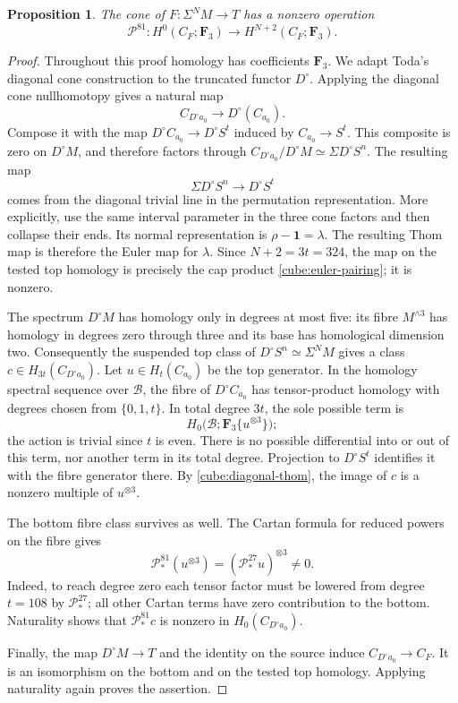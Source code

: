 \documentclass[11pt]{article}
\newtheorem{proposition}[theorem]{Proposition}
\theoremstyle{definition}
\theoremstyle{remark}
\numberwithin{equation}{section}
\begin{document}
\begin{proposition}\label{cube:primary-detection}
The cone of \(F:\Sigma^NM\to T\) has a nonzero operation
\[
 \mathcal P^{81}:H^0(C_F;\mathbf F_3)\longrightarrow
 H^{N+2}(C_F;\mathbf F_3).
\]
\end{proposition}

\begin{proof}
Throughout this proof homology has coefficients \(\mathbf F_3\).
We adapt Toda's diagonal cone construction
\cite[Section~1, Theorem~2]{TodaExtended} to the truncated functor
\(D^\circ\). Applying the diagonal cone nullhomotopy gives a natural map
\[
 C_{D^\circ a_0}\longrightarrow D^\circ(C_{a_0}).
\]
Compose it with the map \(D^\circ C_{a_0}\to D^\circ S^t\)
induced by \(C_{a_0}\to S^t\).  This composite is zero on
\(D^\circ M\), and therefore factors through
\(C_{D^\circ a_0}/D^\circ M\simeq\Sigma D^\circ S^n\).
The resulting map
\begin{equation}\label{cube:diagonal-thom}
 \Sigma D^\circ S^n\longrightarrow D^\circ S^t
\end{equation}
comes from the diagonal trivial line in the permutation
representation.  More explicitly, use the same interval
parameter in the three cone factors and then collapse
their ends.  Its normal representation is
\(\rho-\mathbf1=\lambda\).  The resulting Thom map is
therefore the Euler map for \(\lambda\).
Since \(N+2=3t=324\), the map on the tested top homology
is precisely the cap product \eqref{cube:euler-pairing};
it is nonzero.

The spectrum \(D^\circ M\) has homology only in degrees
at most five: its fibre \(M^{\wedge3}\) has homology in
degrees zero through three and its base has homological
dimension two.  Consequently the suspended top class
of \(D^\circ S^n\simeq\Sigma^NM\) gives a class
\(c\in H_{3t}(C_{D^\circ a_0})\).
Let \(u\in H_t(C_{a_0})\) be the top generator.
In the homology spectral sequence over \(\mathcal B\),
the fibre of \(D^\circ C_{a_0}\) has tensor-product
homology with degrees chosen from \(\{0,1,t\}\).
In total degree \(3t\), the sole possible term is
\[
 H_0\bigl(\mathcal B;\mathbf F_3\{u^{\otimes3}\}\bigr);
\]
the action is trivial since \(t\) is even.
There is no possible differential into or out of this
term, nor another term in its total degree.
Projection to \(D^\circ S^t\) identifies it with the
fibre generator there.  By \eqref{cube:diagonal-thom},
the image of \(c\) is a nonzero multiple of
\(u^{\otimes3}\).

The bottom fibre class survives as well.  The Cartan formula
for reduced powers \cite[Section~2, Property~2.5]{Milnor} on the
fibre gives
\[
 \mathcal P_*^{81}(u^{\otimes3})
       =(\mathcal P_*^{27}u)^{\otimes3}\ne0.
\]
Indeed, to reach degree zero each tensor factor must
be lowered from degree \(t=108\) by \(\mathcal P_*^{27}\);
all other Cartan terms have zero contribution to the
bottom.  Naturality shows that
\(\mathcal P_*^{81}c\) is nonzero in
\(H_0(C_{D^\circ a_0})\).

Finally, the map \(D^\circ M\to T\) and the identity on
the source induce \(C_{D^\circ a_0}\to C_F\).
It is an isomorphism on the bottom and on the tested top
homology.  Applying naturality again proves the assertion.
\end{proof}
\end{document}
